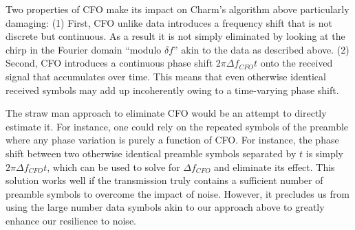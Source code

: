 Two properties of CFO make its impact on Charm's algorithm above particularly damaging: (1) First, CFO unlike data introduces a frequency shift that is not discrete but continuous. As a result it is not simply eliminated by looking at the chirp in the Fourier domain ``modulo $\delta f$''  akin to the data as described above. (2) Second, CFO introduces a continuous phase shift $2 \pi \Delta f_{CFO} t$ onto the received signal that accumulates over time. This means that even otherwise identical received symbols may add up incoherently owing to a time-varying phase shift. 

The straw man approach to eliminate CFO would be an attempt to directly estimate it. For instance, one could rely on the repeated symbols of the preamble where any phase variation is purely a function of CFO. For instance, the phase shift between two otherwise identical preamble symbols separated by $t$ is simply $2 \pi \Delta f_{CFO} t$, which can be used to solve for $\Delta f_{CFO}$ and eliminate its effect. This solution works well if the transmission truly contains a sufficient number of preamble symbols to overcome the impact of noise. However, it precludes us from using the large number data symbols akin to our approach above to greatly enhance our resilience to noise. 


